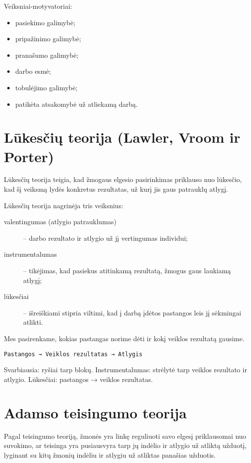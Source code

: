 Veiksniai-motyvatoriai:
\begin{itemize}
  \item pasiekimo galimybė;
  \item pripažinimo galimybė;
  \item pranašumo galimybė;
  \item darbo esmė;
  \item tobulėjimo galimybė;
  \item patikėta atsakomybė už atliekamą darbą.
\end{itemize}

\section{Lūkesčių teorija (Lawler, Vroom ir Porter)}

Lūkesčių teorija teigia, kad žmogaus elgesio pasirinkimas priklauso nuo
lūkesčio, kad šį veiksmą lydės konkretus rezultatas, už kurį jis
gaus patrauklų atlygį.

Lūkesčių teorija nagrinėja tris veiksnius:
\begin{description}
  \item[valentingumas (atlygio patrauklumas)] – darbo rezultato ir
    atlygio už jį vertingumas individui;
  \item[instrumentalumas] – tikėjimas, kad pasiekus atitinkamą rezultatą,
    žmogus gaus laukiamą atlygį;
  \item[lūkesčiai] – išreiškiami stipria viltimi, kad į darbą įdėtos
    pastangos leis jį sėkmingai atlikti.
\end{description}

Mes pasirenkame, kokias pastangas norime dėti ir kokį veiklos rezultatą
gausime.

\begin{verbatim}
Pastangos → Veiklos rezultatas → Atlygis
\end{verbatim}

Svarbiausia: ryšiai tarp blokų. Instrumentalumas: strėlytė tarp veiklos
rezultato ir atlygio. Lūkesčiai: pastangos → veiklos rezultatas.

\section{Adamso teisingumo teorija}

Pagal teisingumo teoriją, žmonės yra linkę reguliuoti savo elgesį
priklausomai nuo suvokimo, ar teisinga yra pusiausvyra tarp jų indėlio
ir atlygio už atliktą užduotį, lyginant su kitų žmonių indėliu ir
atlygiu už atliktas panašias užduotis.

